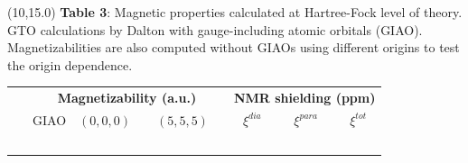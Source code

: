 \documentclass[a0,draft,portrait]{a0poster}
\begin{document}
\begin{textblock}{7}(10,15.0)
\footnotesize
\textbf{Table 3}: Magnetic properties calculated at
Hartree-Fock level of theory. GTO calculations by Dalton\cite{Dalton} 
with gauge-including atomic orbitals (GIAO). Magnetizabilities are also computed 
without GIAOs using different origins to test the origin dependence.
\begin{table}
    \normalsize
    \centering
    \begin{tabular}{|r|crr|ccc|}
\hline                   &\multicolumn{3}{c|}{\textbf{Magnetizability (a.u.)}}
                         &\multicolumn{3}{c|}{\textbf{NMR shielding (ppm)}}\\
                         & GIAO          & $(0,0,0)$\ \  & $(5,5,5)$\ \  &$\xi^{dia}$   & $\xi^{para}$  &$\xi^{tot}$    \\
\hline  \hspace{55mm}\   &\hspace{40mm}\ &\hspace{40mm}\ &\hspace{40mm}\ &\hspace{40mm}\ &\hspace{40mm}\ &\hspace{40mm}\ \\

\end{tabular}
\end{table}
\end{textblock}
\end{document}
